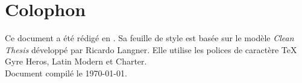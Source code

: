 %
\pagestyle{empty}
\hfill
\vfill
{}
\section*{Colophon}

\noindent Ce document a été rédigé en \LaTeXe.
Sa feuille de style est basée sur le modèle \textit{Clean Thesis} développé par Ricardo Langner.
Elle utilise les polices de caractère TeX Gyre Heros, Latin Modern et Charter.\\
\noindent Document compilé le \today.

